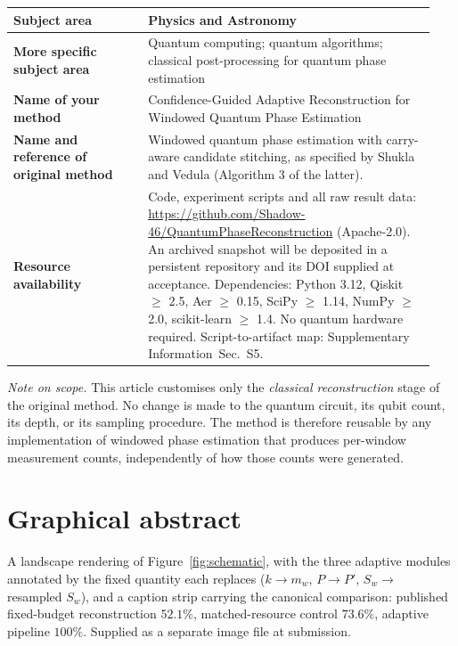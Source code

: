 \documentclass[preprint,11pt]{elsarticle}
\newcommand{\SI}{Supplementary Information}
\newcommand{\SIartifacts}{\SI{}~Sec.~S5}
\begin{document}
\begin{center}
\small
\begin{tabular}{@{}p{0.30\linewidth}p{0.64\linewidth}@{}}
\toprule
\textbf{Subject area} & Physics and Astronomy \\
\midrule
\textbf{More specific subject area} & Quantum computing; quantum
algorithms; classical post-processing for quantum phase estimation \\
\midrule
\textbf{Name of your method} & Confidence-Guided Adaptive Reconstruction
for Windowed Quantum Phase Estimation \\
\midrule
\textbf{Name and reference of original method} & Windowed quantum phase
estimation with carry-aware candidate stitching, as specified by Shukla
and Vedula \cite{wqpe2025,modularshor2025} (Algorithm 3 of the latter). \\
\midrule
\textbf{Resource availability} & Code, experiment scripts and all raw
result data: \url{https://github.com/Shadow-46/QuantumPhaseReconstruction} (Apache-2.0). An
archived snapshot will be deposited in a persistent repository and its
DOI supplied at acceptance. Dependencies: Python 3.12,
Qiskit \cite{qiskit2024} $\geq$ 2.5, Aer $\geq$ 0.15, SciPy $\geq$ 1.14,
NumPy $\geq$ 2.0, scikit-learn $\geq$ 1.4. No quantum hardware required.
Script-to-artifact map: \SIartifacts{}. \\
\bottomrule
\end{tabular}
\end{center}

\noindent
\textit{Note on scope.} This article customises only the \emph{classical
reconstruction} stage of the original method. No change is made to the
quantum circuit, its qubit count, its depth, or its sampling procedure.
The method is therefore reusable by any implementation of windowed phase
estimation that produces per-window measurement counts, independently of
how those counts were generated.

\section*{Graphical abstract}

\noindent
A landscape rendering of Figure~\ref{fig:schematic}, with the three
adaptive modules annotated by the fixed quantity each replaces
($k\to m_w$, $P\to P'$, $S_w\to$ resampled $S_w$), and a caption strip
carrying the canonical comparison: published fixed-budget reconstruction
$52.1\%$, matched-resource control $73.6\%$, adaptive pipeline $100\%$.
Supplied as a separate image file at submission.
\end{document}
